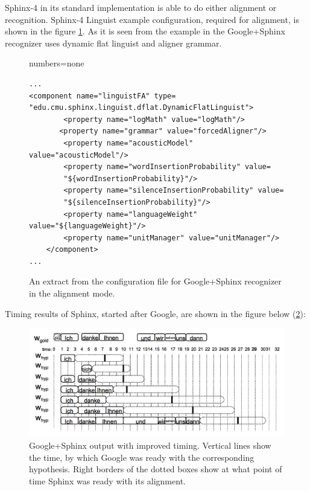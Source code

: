 Sphinx-4 in its standard implementation is able to do either alignment or
recognition. Sphinx-4 Linguist example configuration, required for alignment, is
shown in the figure \ref{fig:conf_al}. As it is seen from the example in the
Google+Sphinx recognizer uses dynamic flat linguist and aligner grammar. 

\begin{figure}[htbp]
  \centering 
 
{numbers=none}  
\lstset{language=XML} 
\begin{lstlisting}[frame=single]
...
<component name="linguistFA" type=
"edu.cmu.sphinx.linguist.dflat.DynamicFlatLinguist">  
        <property name="logMath" value="logMath"/>
       <property name="grammar" value="forcedAligner"/>   
        <property name="acousticModel" value="acousticModel"/>
        <property name="wordInsertionProbability" value=
        "${wordInsertionProbability}"/>
        <property name="silenceInsertionProbability" value=
        "${silenceInsertionProbability}"/>
        <property name="languageWeight" value="${languageWeight}"/>
        <property name="unitManager" value="unitManager"/>
    </component>
...
\end{lstlisting}
 \caption{An extract from the configuration file for Google+Sphinx recognizer in
 the alignment mode.}
  \label{fig:conf_al}
\end {figure}

Timing results of Sphinx, started after Google, are shown in the figure below
(\ref{fig:conf_al_timing}):
\begin{figure}[htbp]
  \centering
    \includegraphics[width=1.0\textwidth]{images/gsphal.png}
 \caption{Google+Sphinx output with improved timing. Vertical lines show
 the time, by which Google was ready with the corresponding hypothesis.
 Right borders of the dotted boxes show at what point of time Sphinx was ready
 with its alignment.}
  \label{fig:conf_al_timing}
\end {figure}

